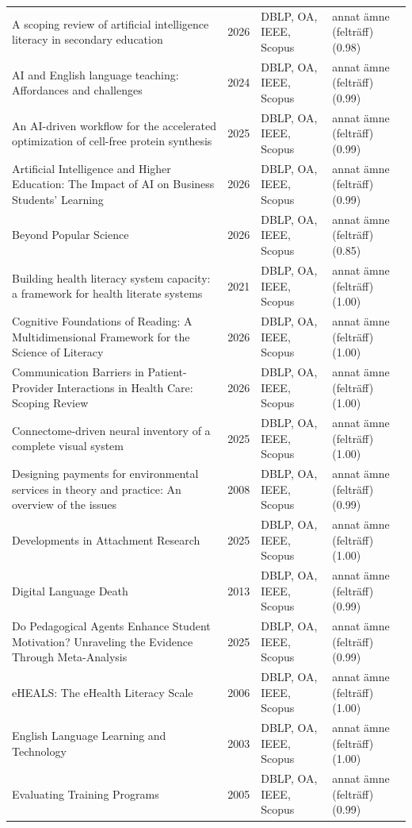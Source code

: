 \begin{longtable}{@{}%
  >{\raggedright\arraybackslash}p{}c%
  >{\raggedright\arraybackslash}p{}%
  >{\raggedright\arraybackslash}p{}@{}}
A scoping review of artificial intelligence literacy in secondary education & 2026 & DBLP, OA, IEEE, Scopus & annat ämne (felträff) (0.98) \\
AI and English language teaching: Affordances and challenges & 2024 & DBLP, OA, IEEE, Scopus & annat ämne (felträff) (0.99) \\
An AI-driven workflow for the accelerated optimization of cell-free protein synthesis & 2025 & DBLP, OA, IEEE, Scopus & annat ämne (felträff) (0.99) \\
Artificial Intelligence and Higher Education: The Impact of AI on Business Students' Learning & 2026 & DBLP, OA, IEEE, Scopus & annat ämne (felträff) (0.99) \\
Beyond Popular Science & 2026 & DBLP, OA, IEEE, Scopus & annat ämne (felträff) (0.85) \\
Building health literacy system capacity: a framework for health literate systems & 2021 & DBLP, OA, IEEE, Scopus & annat ämne (felträff) (1.00) \\
Cognitive Foundations of Reading: A Multidimensional Framework for the Science of Literacy & 2026 & DBLP, OA, IEEE, Scopus & annat ämne (felträff) (1.00) \\
Communication Barriers in Patient-Provider Interactions in Health Care: Scoping Review & 2026 & DBLP, OA, IEEE, Scopus & annat ämne (felträff) (1.00) \\
Connectome-driven neural inventory of a complete visual system & 2025 & DBLP, OA, IEEE, Scopus & annat ämne (felträff) (1.00) \\
Designing payments for environmental services in theory and practice: An overview of the issues & 2008 & DBLP, OA, IEEE, Scopus & annat ämne (felträff) (0.99) \\
Developments in Attachment Research & 2025 & DBLP, OA, IEEE, Scopus & annat ämne (felträff) (1.00) \\
Digital Language Death & 2013 & DBLP, OA, IEEE, Scopus & annat ämne (felträff) (0.99) \\
Do Pedagogical Agents Enhance Student Motivation? Unraveling the Evidence Through Meta-Analysis & 2025 & DBLP, OA, IEEE, Scopus & annat ämne (felträff) (0.99) \\
eHEALS: The eHealth Literacy Scale & 2006 & DBLP, OA, IEEE, Scopus & annat ämne (felträff) (1.00) \\
English Language Learning and Technology & 2003 & DBLP, OA, IEEE, Scopus & annat ämne (felträff) (1.00) \\
Evaluating Training Programs & 2005 & DBLP, OA, IEEE, Scopus & annat ämne (felträff) (0.99) \\

\end{longtable}
